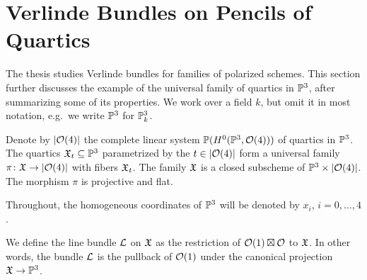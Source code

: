 \section{Verlinde Bundles on Pencils of Quartics}


\newcommand{\schemeofquartics}{\abs{\mc{O}(4)}}

The thesis \cite{hemminghaus-verlinde-bundles} studies Verlinde bundles for
families of polarized schemes. This section further discusses the example of
the universal family of quartics in $\mathbb{P}^3$, after summarizing some of its
properties. We work over a field $k$, but omit it in most notation\footnotemark{}, e.g.\ we write $\mathbb{P}^3$ for $\mathbb{P}^3_k$.


Denote by $\schemeofquartics$ the complete linear system
$\mathbb{P}(H^0(\mathbb{P}^3, \mathcal{O}(4)))$
of quartics in $\mathbb{P}^3$. The quartics $\mathfrak{X}_t \subseteq \mathbb{P}^3$ parametrized by the $t\in\schemeofquartics$ form a universal family
$\pi \from \mf{X} \to \schemeofquartics$ with fibers $\mathfrak{X}_t$.
The family $\mathfrak{X}$ is a closed subscheme of
$\PP^3 \times \schemeofquartics$. The morphism $\pi$ is projective and flat. 


Throughout, the homogeneous coordinates of $\mathbb{P}^3$ will be denoted by
$x_i$, $i=0,\dotsc,4$.

We define the line bundle $\mathcal{L}$ on $\mathfrak{X}$ as the restriction of
$\mathcal{O}(1)\boxtimes\mathcal{O}$ to $\mathfrak{X}$. In other words\footnotemark{}, the bundle $\mathcal{L}$ is the pullback of
$\mathcal{O}(1)$ under the canonical projection $\mathfrak{X} \to \mathbb{P}^3$.


